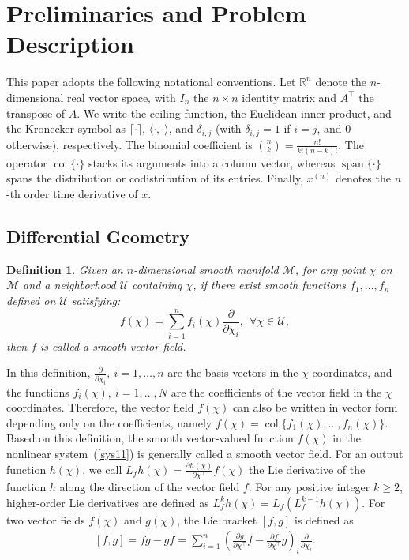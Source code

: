 \documentclass[11pt]{article}
\newtheorem{definition}{Definition}
\DeclareMathOperator{\col}{col}
\begin{document}
\section{Preliminaries and Problem Description}\label{sec2}

This paper adopts the following notational conventions. Let $\mathbb{R}^n$ denote the $n$-dimensional real vector space, with $I_n$ the $n\times n$ identity matrix and $A^{\top}$ the transpose of $A$. We write the ceiling function, the Euclidean inner product, and the Kronecker symbol as $\lceil\cdot\rceil$, $\langle\cdot,\cdot\rangle$, and $\delta_{i,j}$ (with $\delta_{i,j}=1$ if $i=j$, and $0$ otherwise), respectively. The binomial coefficient is $\binom{n}{k} = \frac{n!}{k!(n-k)!}$. The operator $\operatorname{col}\{\cdot\}$ stacks its arguments into a column vector, whereas $\operatorname{span}\{\cdot\}$ spans the distribution or codistribution of its entries. Finally, $x^{(n)}$ denotes the $n$-th order time derivative of $x$.

\subsection{Differential Geometry}
\begin{definition}
	 Given an $n$-dimensional smooth manifold $\mathcal{M}$, for any point $\chi$ on $\mathcal{M}$ and a neighborhood $\mathcal{U}$ containing $\chi$, if there exist smooth functions $f_1,\ldots,f_n$ defined on $\mathcal{U}$ satisfying:
		\begin{equation}\label{eq:ch2-vector field}
			f(\chi)=\sum_{i=1}^nf_i(\chi)\frac{\partial}{\partial \chi_i}, ~~\forall \chi\in\mathcal{U},
		\end{equation}
		then $f$ is called a smooth vector field.
\end{definition}
In this definition, $\frac{\partial}{\partial \chi_i},~i=1,\ldots,n$ are the basis vectors in the $\chi$ coordinates, and the functions $f_i(\chi),~i=1,\ldots,N$ are the coefficients of the vector field in the $\chi$ coordinates. Therefore, the vector field $f(\chi)$ can also be written in vector form depending only on the coefficients, namely $f(\chi)=\col\{f_1(\chi),\ldots,f_n(\chi)\}$. Based on this definition, the smooth vector-valued function $f(\chi)$ in the nonlinear system~(\ref{sys11}) is generally called a smooth vector field. For an output function $h(\chi)$, we call $L_fh(\chi)=\frac{\partial h(\chi)}{\partial \chi^\top}f(\chi)$ the Lie derivative of the function $h$ along the direction of the vector field $f$. For any positive integer $k\geq 2$, higher-order Lie derivatives are defined as $L_f^kh(\chi)=L_f(L_f^{k-1}h(\chi))$. For two vector fields $f(\chi)$ and $g(\chi)$, the Lie bracket $[f,g]$ is defined as 
\begin{align}\label{Lie-bracket}
	[f,g]=fg-gf=\sum_{i=1}^n\left(\frac{\partial g}{\partial \chi^\top}f-\frac{\partial f}{\partial \chi^\top}g\right)_i\frac{\partial}{\partial \chi_i}.
\end{align}
\end{document}
